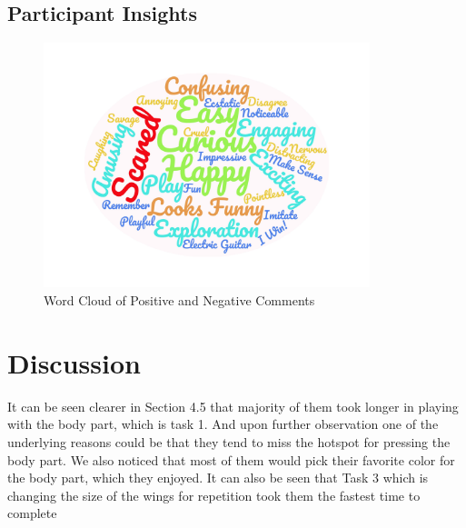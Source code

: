 \subsection{Participant Insights}

\begin{figure}[H]
    \centering
    \includegraphics[width=9.5cm]{NewFigures/wordcloud.jpg}
    \caption{Word Cloud of Positive and Negative Comments}
    \label{fig:wordcloud}
\end{figure}



\section{Discussion}

It can be seen clearer in Section 4.5 that majority of them took longer in playing with the body part, which is task 1. And upon further observation one of the underlying reasons could be that they tend to miss the hotspot for pressing the body part.  We also noticed that most of them would pick their favorite color for the body part, which they enjoyed. It can also be seen that Task 3 which is changing the size of the wings for repetition took them the fastest time to complete

